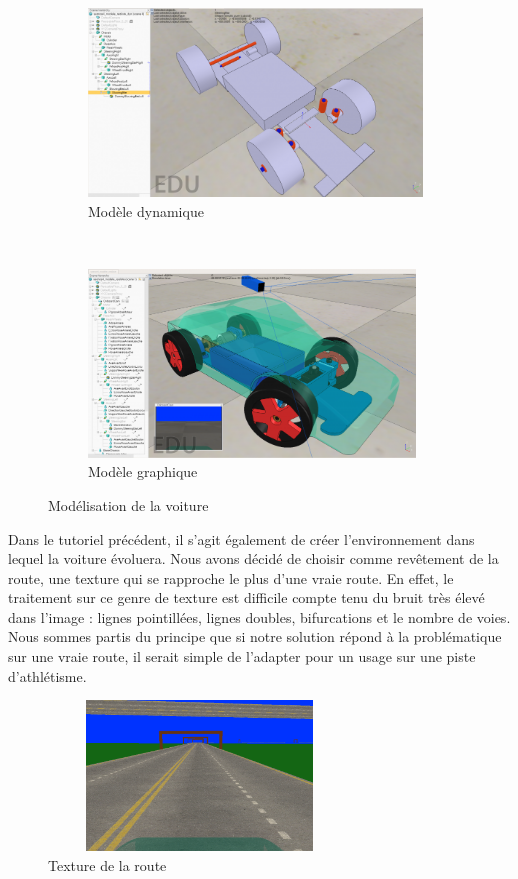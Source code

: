 \documentclass[12pt, openany]{report}
\begin{document}
\begin{figure}[H]
     \centering
     \begin{subfigure}[b]{0.45\textwidth}
         \centering
         \includegraphics[width=\textwidth, height = 5cm]{mod_dyn.png}
         \caption{Modèle dynamique}
     \end{subfigure}
     ~
     \begin{subfigure}[b]{0.45\textwidth}
         \centering
         \includegraphics[width=\textwidth, height = 5cm]{mod_vis.png}
         \caption{Modèle graphique}
     \end{subfigure}
     \caption{Modélisation de la voiture}
     \label{fig:mod_dyn_vis}
\end{figure}

Dans le tutoriel précédent, il s'agit également de créer l'environnement dans lequel la voiture évoluera. Nous avons décidé de choisir comme revêtement de la route, une texture qui se rapproche le plus d'une vraie route. En effet, le traitement sur ce genre de texture est difficile compte tenu du bruit très élevé dans l'image : lignes pointillées, lignes doubles, bifurcations et le nombre de voies. Nous sommes partis du principe que si notre solution répond à la problématique sur une vraie route, il serait simple de l'adapter pour un usage sur une piste d'athlétisme.\\

\begin{figure}[H]
     \centering
     \includegraphics[width=8cm, height = 4cm]{route.png}
     \caption{Texture de la route}
     \label{fig:prob}
\end{figure}
\end{document}
